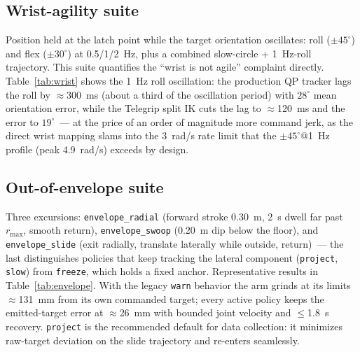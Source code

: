 \begin{table}[h]
  \centering
  \caption{Tracking suite, representative trajectory
  (\texttt{circle\_r5cm}). Full sweep in \texttt{tables/}.}
  \label{tab:tracking}
  \small
  
\end{table}

\subsection{Wrist-agility suite}
\label{sec:exp-wrist}

Position held at the latch point while the target orientation oscillates:
roll (\(\pm45^\circ\)) and flex (\(\pm30^\circ\)) at 0.5/1/\SI{2}{Hz}, plus
a combined slow-circle + \SI{1}{Hz}-roll trajectory. This suite quantifies
the ``wrist is not agile'' complaint directly.
Table~\ref{tab:wrist} shows the \SI{1}{Hz} roll oscillation: the production
QP tracker lags the roll by \(\approx\)\SI{300}{ms} (about a third of the
oscillation period) with \(28^\circ\) mean orientation error, while the
Telegrip split IK cuts the lag to \(\approx\)\SI{120}{ms} and the error to
\(19^\circ\)~--- at the price of an order of magnitude more command jerk,
as the direct wrist mapping slams into the \SI{3}{rad/s} rate limit that
the \(\pm45^\circ\)@\SI{1}{Hz} profile (peak \SI{4.9}{rad/s}) exceeds by
design.

\begin{table}[h]
  \centering
  \caption{Wrist-agility suite, \SI{1}{Hz} roll oscillation
  (\texttt{wrist\_roll\_f1hz}).}
  \label{tab:wrist}
  \small
  
\end{table}

\subsection{Out-of-envelope suite}
\label{sec:exp-envelope}

Three excursions: \texttt{envelope\_radial} (forward stroke \SI{0.30}{m},
\SI{2}{s} dwell far past \(r_{\max}\), smooth return),
\texttt{envelope\_swoop} (\SI{0.20}{m} dip below the floor), and
\texttt{envelope\_slide} (exit radially, translate laterally while outside,
return)~--- the last distinguishes policies that keep tracking the lateral
component (\texttt{project}, \texttt{slow}) from \texttt{freeze}, which
holds a fixed anchor. Representative results in
Table~\ref{tab:envelope}. With the legacy \texttt{warn} behavior the arm
grinds at its limits \(\approx\)\SI{131}{mm} from its own commanded target;
every active policy keeps the emitted-target error at
\(\approx\)\SI{26}{mm} with bounded joint velocity and \(\le\)\SI{1.8}{s}
recovery. \texttt{project} is the recommended default for data collection:
it minimizes raw-target deviation on the slide trajectory and re-enters
seamlessly.

